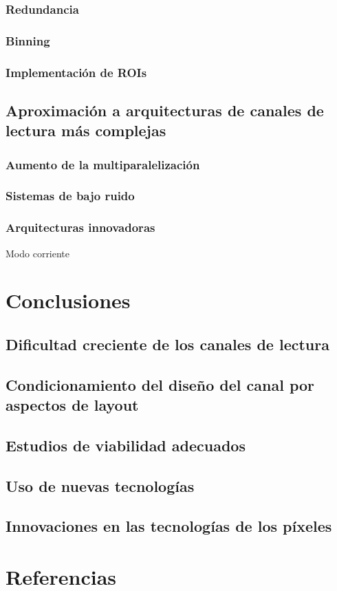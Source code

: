 \documentclass[12pt,a4paper,oneside,titlepage]{report}
\begin{document}
\subsection{Redundancia}

\subsection{Binning}

\subsection{Implementación de ROIs}

\section{Aproximación a arquitecturas de canales de lectura más complejas}

\subsection{Aumento de la multiparalelización}

\subsection{Sistemas de bajo ruido}

\subsection{Arquitecturas innovadoras}
Modo corriente

\chapter{Conclusiones}

\section{Dificultad creciente de los canales de lectura}

\section{Condicionamiento del diseño del canal por aspectos de layout}

\section{Estudios de viabilidad adecuados}

\section{Uso de nuevas tecnologías}

\section{Innovaciones en las tecnologías de los píxeles}

\chapter{Referencias}
\end{document}
